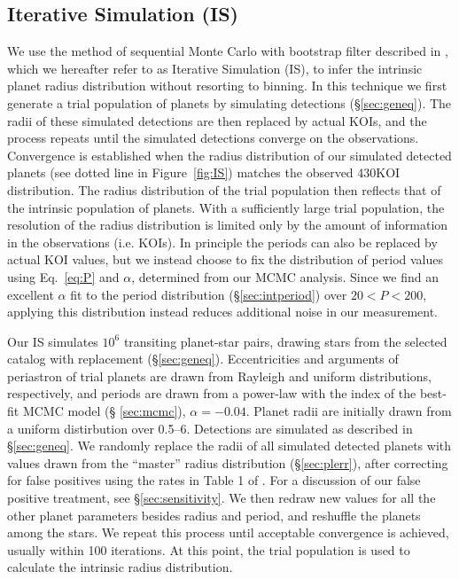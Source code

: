 \subsection{Iterative Simulation (IS)}
\label{sec:IS}  
We use the method of sequential Monte Carlo with bootstrap filter described
in \citet{Olivier2007}, which we hereafter refer to as Iterative Simulation (IS),
to infer the intrinsic planet radius distribution without resorting to binning.  
In this technique we first generate a trial population of planets by 
simulating detections (\S \ref{sec:geneq}).  The radii of
these simulated detections are then replaced by actual KOIs, and the process
repeats until the simulated detections converge on the observations. 
Convergence is established when the radius distribution of 
our simulated detected planets (see dotted line in Figure~\ref{fig:IS}) matches the
observed 430KOI distribution. The radius distribution of the trial population then reflects that of
the intrinsic population of planets.  With a sufficiently large trial
population, the resolution of the radius distribution is limited only
by the amount of information in the observations (i.e. KOIs). 
In principle the periods can also be replaced by actual KOI values, but 
we instead choose to fix the distribution of period values 
using Eq.~\ref{eq:P} and $\alpha$, determined from our MCMC analysis. Since 
we find an excellent $\alpha$ fit to the period distribution (\S \ref{sec:intperiod}) over 
$20<P<200$, applying this distribution instead reduces additional noise in our
measurement.

Our IS simulates $10^6$ transiting planet-star pairs, drawing stars
from the selected catalog with replacement (\S\ref{sec:geneq}).
Eccentricities and arguments of periastron of trial planets are drawn
from Rayleigh and uniform distributions, respectively, and periods are drawn from a
power-law with the index of the best-fit MCMC model (\S
\ref{sec:mcmc}), $\alpha=-0.04$.  Planet radii are initially drawn
from a uniform distirbution over 0.5--6\rearth{}.  Detections are
simulated as described in \S \ref{sec:geneq}.  We randomly
replace the radii of all simulated detected planets with values drawn
from the ``master'' radius distribution (\S\ref{sec:plerr}), 
after correcting for false positives using
the rates in Table 1 of \cite{Fressin2013}.  
For a discussion of our false positive treatment, see
\S\ref{sec:sensitivity}. We then redraw new values
for all the other planet parameters besides radius and period, and
reshuffle the planets among the stars.  We repeat this process until
acceptable convergence is achieved, usually within 100 iterations.  At
this point, the trial population is used to calculate the intrinsic
radius distribution. 

